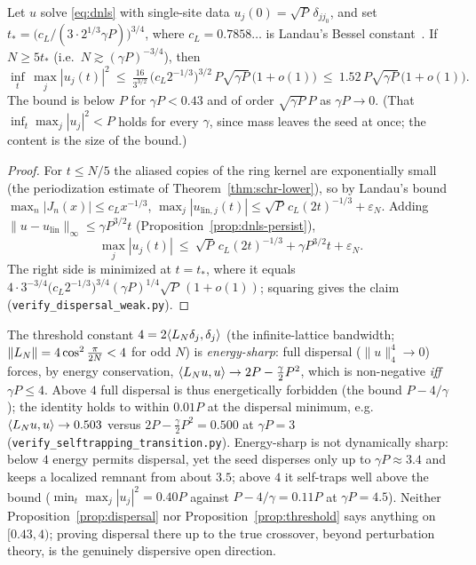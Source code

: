 \begin{proposition}\label{prop:dispersal}
Let $u$ solve \eqref{eq:dnls} with single-site data $u_j(0)=\sqrt P\,\delta_{jj_0}$, and set
$t_\ast=\bigl(c_L/(3\cdot2^{1/3}\gamma P)\bigr)^{3/4}$, where $c_L=0.7858\ldots$ is Landau's Bessel
constant~\cite{Landau00}. If $N\ge5t_\ast$ (i.e.\ $N\gtrsim(\gamma P)^{-3/4}$), then
\[
  \inf_t\,\max_j|u_j(t)|^2\ \le\ \tfrac{16}{3^{3/2}}\,\bigl(c_L2^{-1/3}\bigr)^{3/2}\,P\sqrt{\gamma P}\,
  \bigl(1+o(1)\bigr)\ \le\ 1.52\,P\sqrt{\gamma P}\,\bigl(1+o(1)\bigr).
\]
The bound is below $P$ for $\gamma P<0.43$ and of order $\sqrt{\gamma P}\,P$ as $\gamma P\to0$. (That
$\inf_t\max_j|u_j|^2<P$ holds for every $\gamma$, since mass leaves the seed at once; the content is the size
of the bound.)
\end{proposition}

\begin{proof}
For $t\le N/5$ the aliased copies of the ring kernel are exponentially small (the periodization
estimate of Theorem~\ref{thm:schr-lower}), so by Landau's bound $\max_n|J_n(x)|\le c_Lx^{-1/3}$,
$\max_j|u_{\mathrm{lin},j}(t)|\le\sqrt P\,c_L(2t)^{-1/3}+\varepsilon_N$. Adding
$\|u-u_{\mathrm{lin}}\|_\infty\le\gamma P^{3/2}t$ (Proposition~\ref{prop:dnls-persist}),
\[
  \max_j|u_j(t)|\ \le\ \sqrt P\,c_L(2t)^{-1/3}+\gamma P^{3/2}t+\varepsilon_N .
\]
The right side is minimized at $t=t_\ast$, where it equals
$4\cdot3^{-3/4}\bigl(c_L2^{-1/3}\bigr)^{3/4}(\gamma P)^{1/4}\sqrt P\,(1+o(1))$; squaring gives the claim
(\texttt{verify\_dispersal\_weak.py}). \end{proof}

\noindent The threshold constant $4=2\langle L_N\delta_j,\delta_j\rangle$ (the infinite-lattice bandwidth;
$\|L_N\|=4\cos^2\frac\pi{2N}<4$ for odd $N$) is \emph{energy-sharp}: full dispersal ($\|u\|_4^4\to0$) forces,
by energy conservation, $\langle L_N u,u\rangle\to 2P-\tfrac\gamma2P^2$, which is non-negative \emph{iff}
$\gamma P\le4$. Above $4$ full dispersal is thus energetically forbidden (the bound $P-4/\gamma$); the
identity holds to within $0.01P$ at the dispersal minimum, e.g.\ $\langle L_N u,u\rangle\to0.503$ versus
$2P-\tfrac\gamma2P^2=0.500$ at $\gamma P=3$ (\texttt{verify\_selftrapping\_transition.py}). Energy-sharp is not
dynamically sharp: below $4$ energy permits dispersal, yet the seed disperses only up to $\gamma P\approx3.4$
and keeps a localized remnant from about $3.5$; above $4$ it self-traps well above the bound
($\min_t\max_j|u_j|^2=0.40P$ against $P-4/\gamma=0.11P$ at $\gamma P=4.5$). Neither
Proposition~\ref{prop:dispersal} nor Proposition~\ref{prop:threshold} says anything on $[0.43,4)$; proving
dispersal there up to the true crossover, beyond perturbation theory, is the genuinely dispersive open
direction.

